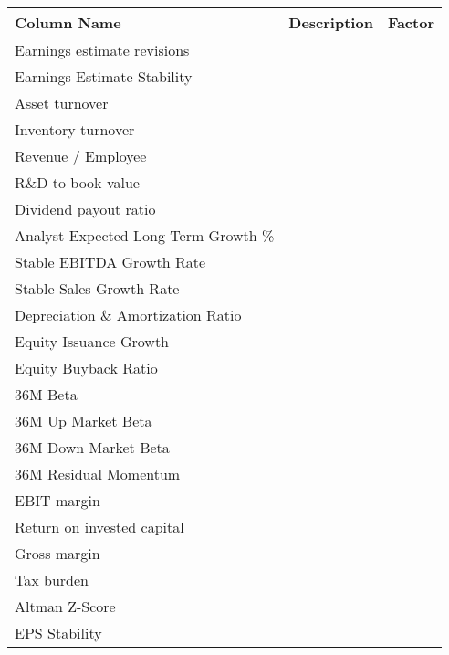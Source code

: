 \begin{tabular}{lll}
\hline
 Column Name                         & Description   & Factor   \\
\hline
 Earnings estimate revisions         &               &          \\
 Earnings Estimate Stability         &               &          \\
 Asset turnover                      &               &          \\
 Inventory turnover                  &               &          \\
 Revenue / Employee                  &               &          \\
 R\&D to book value                   &               &          \\
 Dividend payout ratio               &               &          \\
 Analyst Expected Long Term Growth \% &               &          \\
 Stable EBITDA Growth Rate           &               &          \\
 Stable Sales Growth Rate            &               &          \\
 Depreciation \& Amortization Ratio   &               &          \\
 Equity Issuance Growth              &               &          \\
 Equity Buyback Ratio                &               &          \\
 36M Beta                            &               &          \\
 36M Up Market Beta                  &               &          \\
 36M Down Market Beta                &               &          \\
 36M Residual Momentum               &               &          \\
 EBIT margin                         &               &          \\
 Return on invested capital          &               &          \\
 Gross margin                        &               &          \\
 Tax burden                          &               &          \\
 Altman Z-Score                      &               &          \\
 EPS Stability                       &               &          \\

\end{tabular}
